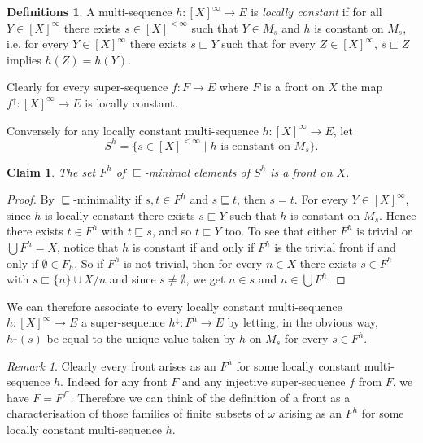 \documentclass{article}%
\theoremstyle{plain}
\newtheorem{lemma}[theorem]{Properties}
\newtheorem{lemma}[theorem]{Lemma}
\newtheorem{lemma}[theorem]{Fact}
\newtheorem{lemma}[theorem]{Facts}
\newtheorem{lemma}{Claim}
\theoremstyle{definition}
\newtheorem{definition}[theorem]{Definition}
\newtheorem{definition}[theorem]{Notation}
\newtheorem{definition}[theorem]{Notations}
\newtheorem{definition}[theorem]{Definitions}
\theoremstyle{remark}
\newtheorem{remark}[theorem]{Remark}
\DeclareMathOperator{\base}{\mathord{\bigcup}}
\DeclareMathOperator{\upcl}{\uparrow}
\DeclareMathOperator{\dcl}{\downarrow}
\newcommand{\segm} {\sqsubseteq}
\newcommand{\segs} {\sqsubset}
\newcommand{\finSub}[1] {[#1]^{<\infty}}
\newcommand{\infSub}[1]{[#1]^{\infty}}
\begin{document}
\begin{definition}
A multi-sequence $h:\infSub{X}\to E$ is \emph{locally constant} if for all $Y\in\infSub{X}$ there exists $s\in\finSub{X}$ such that $Y\in M_{s}$ and $h$ is constant on $M_{s}$, i.e. for every $Y\in\infSub{X}$ there exists $s\segs Y$ such that for every $Z\in\infSub{X}$, $s\segs Z$ implies $h(Z)=h(Y)$.
\end{definition}



Clearly for every super-sequence $f:F\to E$ where $F$ is a front on $X$ the map $f^{\upcl}:\infSub{X}\to E$ is locally constant. 

Conversely for any locally constant multi-sequence $h:\infSub{X}\to E$, let 
 \[
 S^{h}=\{s\in \finSub{X}\mid \text{$h$ is constant on $M_{s}$}\}.
 \]
 
 \begin{lemma}
 The set $F^{h}$ of $\segm$-minimal elements of $S^{h}$ is a front on $X$.
 \end{lemma}
 \begin{proof}
 By $\segm$-minimality if $s,t\in F^{h}$ and $s\segm t$, then $s=t$. For every $Y\in\infSub{X}$, since $h$ is locally constant there exists $s\segs Y$ such that $h$ is constant on $M_{s}$. Hence there exists $t\in F^{h}$ with $t\segm s$, and so $t\segs Y$ too. To see that either $F^{h}$ is trivial or $\base F^{h}=X$, notice that $h$ is constant if and only if $F^{h}$ is the trivial front if and only if $\emptyset\in F_{h}$. So if $F^{h}$ is not trivial, then for every $n\in X$ there exists $s\in F^{h}$ with $s\segs \{n\}\cup X/n$ and since $s\neq\emptyset$, we get $n\in s$ and $n\in \base F^{h}$.  
 \end{proof}

We can therefore associate to every locally constant multi-sequence $h:\infSub{X}\to E$ a super-sequence $h^{\dcl}:F^{h}\to E$ by letting, in the obvious way, $h^{\dcl}(s)$ be equal to the unique value taken by $h$ on $M_{s}$ for every $s\in F^{h}$.

\begin{remark}
Clearly every front arises as an $F^{h}$ for some locally constant multi-sequence $h$. Indeed for any front $F$ and any injective super-sequence $f$ from $F$, we have $F=F^{f^{\upcl}}$. Therefore we can think of the definition of a front as a characterisation of those families of finite subsets of $\omega$ arising as an $F^{h}$ for some locally constant multi-sequence $h$.
\end{remark}
\end{document}

